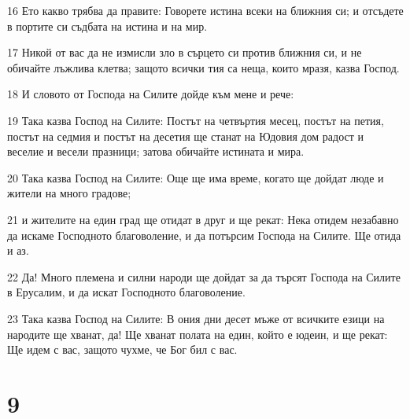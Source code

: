 \par 16 Ето какво трябва да правите: Говорете истина всеки на ближния си; и отсъдете в портите си съдбата на истина и на мир.
\par 17 Никой от вас да не измисли зло в сърцето си против ближния си, и не обичайте лъжлива клетва; защото всички тия са неща, които мразя, казва Господ.
\par 18 И словото от Господа на Силите дойде към мене и рече:
\par 19 Така казва Господ на Силите: Постът на четвъртия месец, постът на петия, постът на седмия и постът на десетия ще станат на Юдовия дом радост и веселие и весели празници; затова обичайте истината и мира.
\par 20 Така казва Господ на Силите: Още ще има време, когато ще дойдат люде и жители на много градове;
\par 21 и жителите на един град ще отидат в друг и ще рекат: Нека отидем незабавно да искаме Господното благоволение, и да потърсим Господа на Силите. Ще отида и аз.
\par 22 Да! Много племена и силни народи ще дойдат за да търсят Господа на Силите в Ерусалим, и да искат Господното благоволение.
\par 23 Така казва Господ на Силите: В ония дни десет мъже от всичките езици на народите ще хванат, да! Ще хванат полата на един, който е юдеин, и ще рекат: Ще идем с вас, защото чухме, че Бог бил с вас.

\chapter{9}

